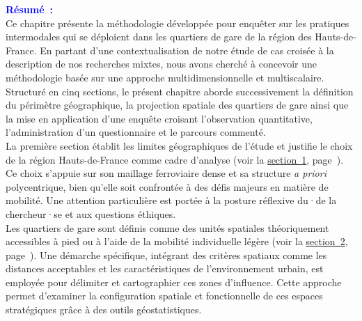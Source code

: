 \begin{refsegment}
    \newpage
    \begin{tcolorbox}[colback=white!5!white,
                      colframe=blue!75!blue,
                      title=
                      \bigskip
                      \center{\textbf{Préambule du chapitre~3}}
                      \\
                      \raggedright{\small{Chapitre composé de \pagedifference{chap3:titre}{part1:conclusion} pages, dont \pagedifference{chap3:bibliographie}{part1:conclusion} pages de bibliographie}}
                      \bigskip]
\Large{\textcolor{blue}{\textbf{Résumé~:}}}
    \\
    \small{
Ce chapitre présente la méthodologie développée pour enquêter sur les pratiques intermodales qui se déploient dans les quartiers de gare de la région des Hauts-de-France. En partant d'une contextualisation de notre étude de cas croisée à la description de nos recherches mixtes, nous avons cherché à concevoir une méthodologie basée sur une approche multidimensionnelle et multiscalaire. Structuré en cinq sections, le présent chapitre aborde successivement la définition du périmètre géographique, la projection spatiale des quartiers de gare ainsi que la mise en application d'une enquête croisant l'observation quantitative, l’administration d'un questionnaire et le parcours commenté.%
    \\
La première section établit les limites géographiques de l’étude et justifie le choix de la région Hauts-de-France comme cadre d’analyse (voir la \hyperref[chap3:region-hauts-de-france]{section~1}, page~\pageref{chap3:region-hauts-de-france}). Ce choix s’appuie sur son maillage ferroviaire dense et sa structure \textsl{a priori} polycentrique, bien qu’elle soit confrontée à des défis majeurs en matière de mobilité. Une attention particulière est portée à la posture réflexive du·de la chercheur·se et aux questions éthiques.%
    \\
Les quartiers de gare sont définis comme des unités spatiales théoriquement accessibles à pied ou à l'aide de la mobilité individuelle légère (voir la \hyperref[chap3:quartiers-gare]{section~2}, page~\pageref{chap3:quartiers-gare}). Une démarche spécifique, intégrant des critères spatiaux comme les distances acceptables et les caractéristiques de l’environnement urbain, est employée pour délimiter et cartographier ces zones d’influence. Cette approche permet d’examiner la configuration spatiale et fonctionnelle de ces espaces stratégiques grâce à des outils géostatistiques.%
}
\end{tcolorbox}
\end{refsegment}
